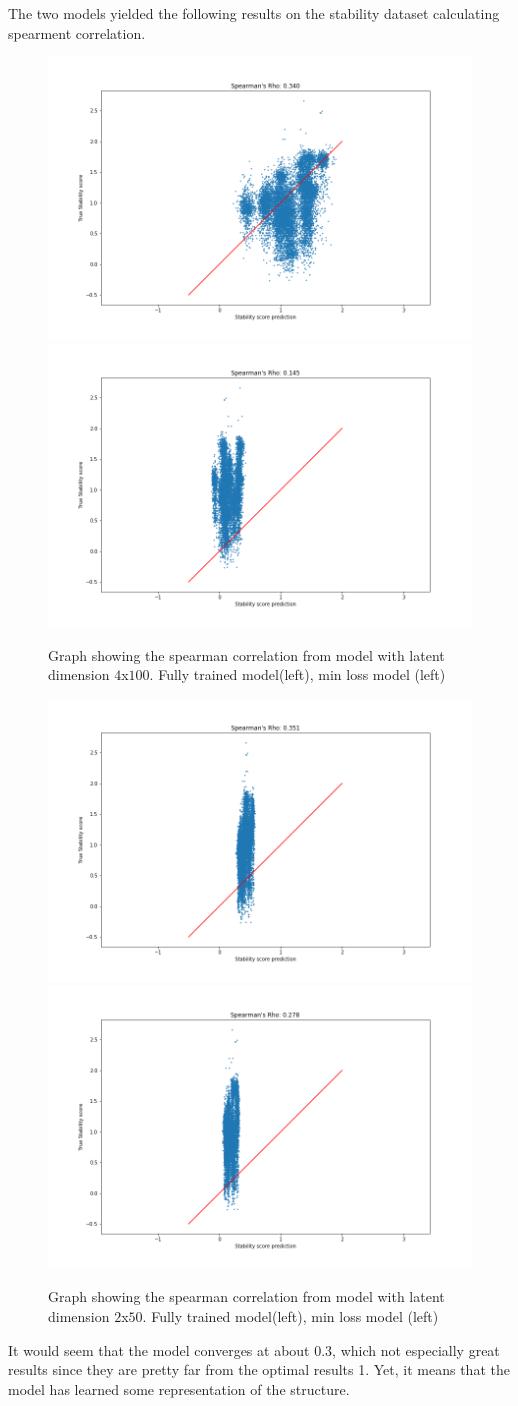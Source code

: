 \noindent
The two models yielded the following results on the stability dataset calculating spearment correlation.


\begin{figure}[!ht]
  \centering
  \includegraphics[width=0.4\linewidth]{latex/imgs/CNN_spearman_correlation_100_fully.png}
  \includegraphics[width=0.4\linewidth]{latex/imgs/CNN_spearman_correlation_100_best.png}
  \caption{Graph showing the spearman correlation from model with latent dimension $4$x$100$. Fully trained model(left), min loss model (left)}
\end{figure}

\begin{figure}[!ht]
  \centering
  \includegraphics[width=0.4\linewidth]{latex/imgs/CNN_spearman_correlation_50_fully.png}
  \includegraphics[width=0.4\linewidth]{latex/imgs/CNN_spearman_correlation_50_best.png}
  \caption{Graph showing the spearman correlation from model with latent dimension $2$x$50$. Fully trained model(left), min loss model (left)}
\end{figure}

It would seem that the model converges at about 0.3, which not especially great results since they are pretty far from the optimal results 1. Yet, it means that the model has learned some representation of the structure.